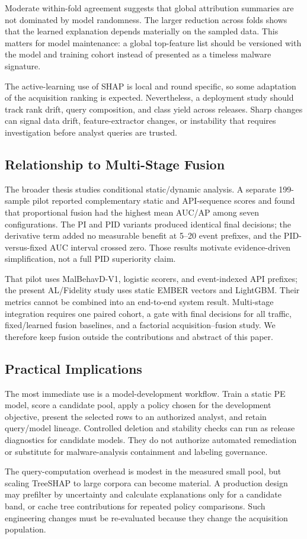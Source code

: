 Moderate within-fold agreement suggests that global attribution summaries are
not dominated by model randomness. The larger reduction across folds shows that
the learned explanation depends materially on the sampled data. This matters for
model maintenance: a global top-feature list should be versioned with the model
and training cohort instead of presented as a timeless malware signature.

The active-learning use of SHAP is local and round specific, so some adaptation
of the acquisition ranking is expected. Nevertheless, a deployment study should
track rank drift, query composition, and class yield across releases. Sharp
changes can signal data drift, feature-extractor changes, or instability that
requires investigation before analyst queries are trusted.

\subsection{Relationship to Multi-Stage Fusion}

The broader thesis studies conditional static/dynamic analysis. A separate
199-sample pilot reported complementary static and API-sequence scores and found
that proportional fusion had the highest mean AUC/AP among seven configurations.
The PI and PID variants produced identical final decisions; the derivative term
added no measurable benefit at 5--20 event prefixes, and the PID-versus-fixed AUC
interval crossed zero. Those results motivate evidence-driven simplification,
not a full PID superiority claim.

That pilot uses MalBehavD-V1, logistic scorers, and event-indexed API prefixes;
the present AL/Fidelity study uses static EMBER vectors and LightGBM. Their
metrics cannot be combined into an end-to-end system result. Multi-stage
integration requires one paired cohort, a gate with final decisions for all
traffic, fixed/learned fusion baselines, and a factorial acquisition--fusion
study. We therefore keep fusion outside the contributions and abstract of this
paper.

\subsection{Practical Implications}

The most immediate use is a model-development workflow. Train a static PE model,
score a candidate pool, apply a policy chosen for the development objective,
present the selected rows to an authorized analyst, and retain query/model
lineage. Controlled deletion and stability checks can run as release diagnostics
for candidate models. They do not authorize automated remediation or substitute
for malware-analysis containment and labeling governance.

The query-computation overhead is modest in the measured small pool, but scaling
TreeSHAP to large corpora can become material. A production design may prefilter
by uncertainty and calculate explanations only for a candidate band, or cache
tree contributions for repeated policy comparisons. Such engineering changes
must be re-evaluated because they change the acquisition population.

